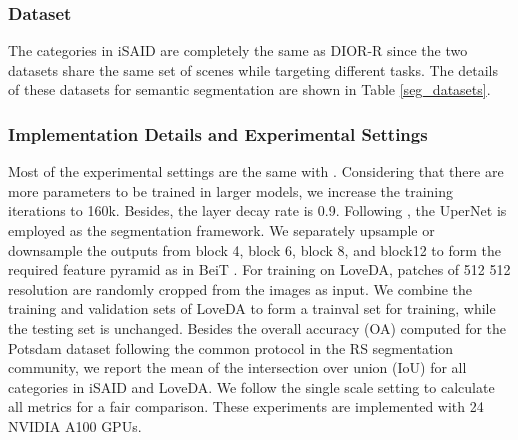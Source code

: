 \documentclass[10pt, journal,twoside]{IEEEtran}
\begin{document}
\subsubsection{Dataset}

\begin{table}[t]
  \caption{The details of different semantic segmentation datasets.}
  \newcommand{\tabincell}[2]{\begin{tabular}{@{}#1@{}}#2\end{tabular}}
  \centering
  \label{seg_datasets}
\end{table}

The categories in iSAID are completely the same as DIOR-R since the two datasets share the same set of scenes while targeting different tasks. The details of these datasets for semantic segmentation are shown in Table \ref{seg_datasets}.

\subsubsection{Implementation Details and Experimental Settings}
Most of the experimental settings are the same with \cite{wang_rsp_2022}. Considering that there are more parameters to be trained in larger models, we increase the training iterations to 160k. Besides, the layer decay rate is 0.9. Following \cite{swint,xu2021vitae,wang_rsp_2022}, the UperNet \cite{upernet} is employed as the segmentation framework. We separately upsample or downsample the outputs from block 4, block 6, block 8, and block12 to form the required feature pyramid as in BeiT \cite{beit}. For training on LoveDA, patches of 512  512 resolution are randomly cropped from the images as input. We combine the training and validation sets of LoveDA to form a trainval set for training, while the testing set is unchanged. Besides the overall accuracy (OA) computed for the Potsdam dataset following the common protocol in the RS segmentation community, we report the mean of the intersection over union (IoU) for all categories in iSAID and LoveDA. We follow the single scale setting to calculate all metrics for a fair comparison. These experiments are implemented with 24 NVIDIA A100 GPUs. 
\end{document}
